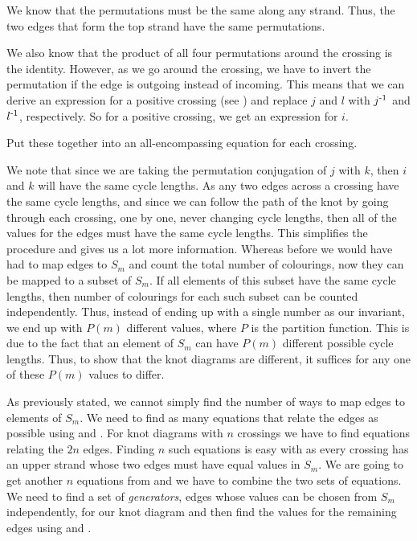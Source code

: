 \begin{paper}
We know that the permutations must be the same along any strand.
Thus, the two edges that form the top strand have the same permutations.


We also know that the product of all four permutations around the crossing is
the identity.
However, as we go around the crossing, we have to invert the permutation if the
edge is outgoing instead of incoming.
This means that we can derive an expression for a positive crossing (see
\figCrossings) and replace $j$ and $l$ with $j^{\text-1}$ and $l^{\text-1}$,
respectively.
So for a positive crossing, we get an expression for $i$.


Put these together into an all-encompassing equation for each crossing.



We note that since we are taking the permutation conjugation of $j$ with $k$,
then $i$ and $k$ will have the same cycle lengths.
As any two edges across a crossing have the same cycle lengths, and since we can
follow the path of the knot by going through each crossing, one by one, never
changing cycle lengths, then all of the values for the edges must have the same
cycle lengths.
This simplifies the procedure and gives us a lot more information.
Whereas before we would have had to map edges to $S_m$ and count the total
number of colourings, now they can be mapped to a subset of $S_m$.
If all elements of this subset have the same cycle lengths, then number of
colourings for each such subset can be counted independently.
Thus, instead of ending up with a single number as our invariant, we end up with
$P(m)$ different values, where $P$ is the partition function.
This is due to the fact that an element of $S_m$ can have $P(m)$ different
possible cycle lengths.
Thus, to show that the knot diagrams are different, it suffices for any one of
these $P(m)$ values to differ.

As previously stated, we cannot simply find the number of ways to map edges to
elements of $S_m$.
We need to find as many equations that relate the edges as possible using
\eqUpper and \eqLower.
For knot diagrams with $n$ crossings we have to find equations relating the $2n$
edges.
Finding $n$ such equations is easy with \eqUpper as every crossing has an upper
strand whose two edges must have equal values in $S_m$.
We are going to get another $n$ equations from \eqBoth and we have to combine
the two sets of equations.
We need to find a set of \textit{generators}, edges whose values can be chosen
from $S_m$ independently, for our knot diagram and then find the values for the
remaining edges using \eqUpper and \eqBoth.


\end{paper}

